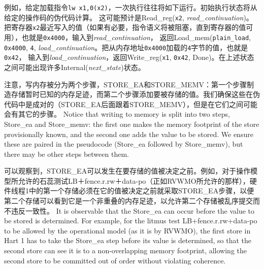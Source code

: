 \begin{commentary}
  例如，给定加载指令\verb!lw x1,0(x2)!，一次执行往往将如下运行。初始执行状态将从给定的操作码的伪代码计算。
  这可能预计是{\sc Read\_reg}({\tt x2}, {\it read\_continuation})。
  把寄存器{\tt x2}最近写入的值（如果有必要，指令语义将被阻塞，直到寄存器的值可用），也就是{\tt 0x4000}，输入到{\it read\_continuation}，
  返回{\sc Load\_mem}({\tt plain\_load}, {\tt 0x4000}, {\tt 4}, {\it load\_continuation}。把从内存地址{\tt 0x4000}加载的{\tt 4}字节的值，也就是{\tt 0x42}，
  输入到{\it load\_continuation}，返回{\sc Write\_reg}({\tt x1}, {\tt 0x42}, {\sc Done})。在上述状态之间可能出现许多{\sc Internal}({\it next\_state})状态。
\end{commentary}

注意，写内存被分为两个步骤，STORE_EA和STORE_MEMV：第一个步骤制造存储暂时已知的内存足迹，而第二个步骤添加要被存储的值。我们确保这些在伪代码中是成对的（STORE_EA后面跟着STORE_MEMV），但是在它们之间可能会有其它的步骤。
Notice that writing to memory is split into two steps, {\sc Store\_ea} and {\sc Store\_memv}: the first one makes the memory footprint of the store provisionally known, and the second one adds the value to be stored.
We ensure these are paired in the pseudocode ({\sc Store\_ea} followed by {\sc Store\_memv}), but there may be other steps between them.
\begin{commentary}
  可以观察到，STORE_EA可以发生在要存储的值被决定之前。例如，对于操作模型所允许的石蕊测试LB＋fence.r.rw＋data-po（正如RVWMO所允许的那样），硬件线程1中的第一个存储必须在它的值被决定之前就采取STORE_EA步骤，以便第二个存储可以看到它是一个非重叠的内存足迹，以允许第二个存储被乱序提交而不违反一致性。
It is observable that the {\sc Store\_ea} can occur before the value to be stored is determined.
For example, for the litmus test LB+fence.r.rw+data-po to be allowed by the operational model (as it is by RVWMO), the first store in Hart 1 has to take the {\sc Store\_ea} step before its value is determined, so that the second store can see it is to a non-overlapping memory footprint, allowing the second store to be committed out of order without violating coherence.
\end{commentary}

